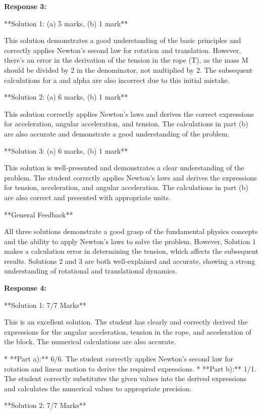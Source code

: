 \documentclass[a4paper,11pt]{article}
\begin{document}
\bigskip    
\textbf{Response 3:}

**Solution 1: (a) 5 marks, (b) 1 mark**

This solution demonstrates a good understanding of the basic principles and correctly applies Newton's second law for rotation and translation. However, there's an error in the derivation of the tension in the rope (T), as the mass M should be divided by 2 in the denominator, not multiplied by 2. The subsequent calculations for a and alpha are also incorrect due to this initial mistake.

**Solution 2: (a) 6 marks, (b) 1 mark**

This solution correctly applies Newton's laws and derives the correct expressions for acceleration, angular acceleration, and tension. The calculations in part (b) are also accurate and demonstrate a good understanding of the problem.

**Solution 3: (a) 6 marks, (b) 1 mark**

This solution is well-presented and demonstrates a clear understanding of the problem. The student correctly applies Newton's laws and derives the expressions for tension, acceleration, and angular acceleration. The calculations in part (b) are also correct and presented with appropriate units.

**General Feedback**

All three solutions demonstrate a good grasp of the fundamental physics concepts and the ability to apply Newton's laws to solve the problem. However, Solution 1 makes a calculation error in determining the tension, which affects the subsequent results. Solutions 2 and 3 are both well-explained and accurate, showing a strong understanding of rotational and translational dynamics.

\textbf{Response 4:}

**Solution 1: 7/7 Marks**

This is an excellent solution. The student has clearly and correctly derived the expressions for the angular acceleration, tension in the rope, and acceleration of the block. The numerical calculations are also accurate.

*   **Part a):** 6/6. The student correctly applies Newton's second law for rotation and linear motion to derive the required expressions.
*   **Part b):** 1/1. The student correctly substitutes the given values into the derived expressions and calculates the numerical values to appropriate precision.

**Solution 2: 7/7 Marks**
\end{document}
